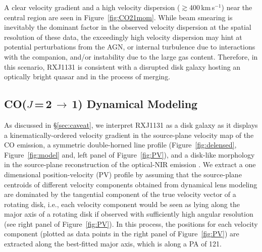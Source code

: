 \documentclass[]{emulateapj}
\newcommand{\rarr}{$\rightarrow$}
\newcommand{\bco}{\mbox{CO($J$\,=\,2\,\rarr\,1)}\xspace}
\newcommand{\kms}{\mbox{km\,s$^{-1}$}\xspace}
\newcommand{\Fig}[1]{Figure~\ref{fig:#1}}
\newcommand{\Sec}[1]{\S\ref{sec:#1}}
\begin{document}
A clear velocity gradient and a high
velocity dispersion ($\gtrsim$400\,\kms) near the central region
are seen in \Fig{CO21mom}. While beam smearing is inevitably the
dominant factor in the observed velocity dispersion
at the spatial resolution of these data, the exceedingly
high velocity dispersion may hint
at potential perturbations from the AGN, or internal turbulence due to
interactions with the companion, and/or instability due to the large gas
content.
Therefore, in this scenario, RXJ1131 is
consistent with a disrupted disk galaxy hosting an optically
bright quasar and in the process of merging.

\subsection{\bco Dynamical Modeling} \label{sec:dynamics}
As discussed in \Sec{caveat}, we interpret RXJ1131 as a disk galaxy as it displays
a kinematically-ordered velocity gradient in the source-plane velocity map of the CO emission,
a symmetric double-horned line profile (\Fig{delensed}, \Fig{model} and, left panel of \Fig{PV}),
and a disk-like morphology in the source-plane reconstruction of the optical-NIR emission
.
We extract a one dimensional position-velocity (PV) profile
by assuming that the source-plane centroids of different velocity components
obtained from dynamical lens modeling
are dominated by the tangential component of the
true velocity vector of a rotating disk, i.e., each velocity component would
be seen as lying along the major axis of a rotating disk if observed with sufficiently high angular resolution
(see right panel of \Fig{PV}).
In this process, the positions for each velocity component (plotted as data points in the right panel of \Fig{PV})
are extracted along the best-fitted major axis, which is along a PA of 121\degr.
\end{document}

